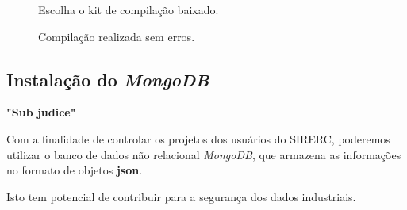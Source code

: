 \documentclass[a4paper,11pt]{article}
\newcommand{\sistema}{\textsf{SIRERC}}
\newcommand{\mongo}{\textit{MongoDB}}
\newcommand{\cautionbox}[1]{
	\vskip 5mm
	\begin{leftbar}
		\textbf{#1}
	\end{leftbar}
	\vskip 5mm
}
\begin{document}
\begin{enumerate}
\begin{figure}[H]
	\centering
	\caption{Escolha o kit de compilação baixado.}\label{fig:qt_tools_ext_config_kit}
\end{figure}

\begin{figure}[H]
	\centering
	\caption{Compilação realizada sem erros.}\label{fig:qt_no_error_compile}
\end{figure}

\end{enumerate}


\subsection{Instalação do \mongo{}}

\cautionbox{\color{red}"Sub judice"}

\color{brown}

Com a finalidade de controlar os projetos dos usuários do \sistema{}, poderemos utilizar o banco de dados não relacional \mongo{}, que armazena as informações no formato de objetos \textbf{json}.

Isto tem potencial de contribuir para a segurança dos dados industriais.
\end{document}
